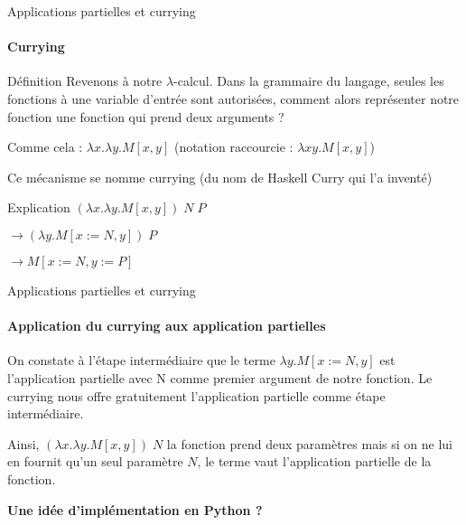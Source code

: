 \documentclass[aspectratio=169]{beamer}
\begin{document}
\begin{frame}[fragile]{Applications partielles et currying}

    \framesubtitle{Currying}

    \begin{block}{Définition}
        Revenons à notre $\lambda$-calcul. Dans la grammaire du langage, seules les fonctions à une variable d'entrée sont autorisées, comment alors représenter notre fonction une fonction qui prend deux arguments ?

        \pause

        Comme cela : $\lambda x.\lambda y. M[x, y]$ (notation raccourcie : $\lambda xy.M[x, y]$)

        Ce mécanisme se nomme currying (du nom de Haskell Curry qui l'a inventé)

    \end{block}
    \begin{exampleblock}{Explication}
        \pause
        $(\lambda x.\lambda y.M[x,y])\;N\;P$
        
        $\rightarrow (\lambda y.M[x:=N,y])\;P$
        
        $\rightarrow M[x:=N, y:=P]$  
    \end{exampleblock}
    
\end{frame}

\begin{frame}{Applications partielles et currying}

    \framesubtitle{Application du currying aux application partielles}

    On constate à l'étape intermédiaire que le terme $\lambda y.M[x:=N,y]$ est l'application partielle avec N comme premier argument de notre fonction. Le currying nous offre gratuitement l'application partielle comme étape intermédiaire.

    Ainsi, $(\lambda x.\lambda y.M[x,y])\;N$ la fonction prend deux paramètres mais si on ne lui en fournit qu'un seul paramètre $N$, le terme vaut l'application partielle de la fonction.

    \textbf{Une idée d'implémentation en Python ?}
    
\end{frame}
\end{document}
